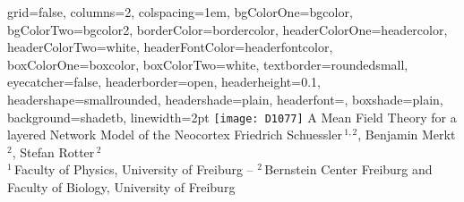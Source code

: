 \documentclass[portrait, final, a0paper, fontscale=0.34, leqno]{baposter}
\begin{document}
\newlength{\leftimgwidth}
\begin{poster}%
  {
  grid=false,
  columns=2,
  colspacing=1em,
  bgColorOne=bgcolor,
  bgColorTwo=bgcolor2,
  borderColor=bordercolor,
  headerColorOne=headercolor,
  headerColorTwo=white, %
  headerFontColor=headerfontcolor,
  boxColorOne=boxcolor,
  boxColorTwo=white,    %
  textborder=roundedsmall,
  eyecatcher=false,
  headerborder=open, 
  headerheight=0.1\textheight,
  headershape=smallrounded,
  headershade=plain,
  headerfont=\Large\textsf, %
  boxshade=plain,
  background=shadetb,
  linewidth=2pt
  }
  {\texttt{[image: D1077]}} %
  {\sf %
      A Mean Field Theory for a layered Network Model of the Neocortex
\vspace{0.3em}}
  {\sf %
      \vspace{0em}\Large{Friedrich Schuessler\,$^{1,2}$, Benjamin Merkt\,$^{2}$, Stefan Rotter\,$^{2}$\\
  \normalsize
  $^1$\,Faculty of Physics, University of Freiburg -- 
  $^2$\,Bernstein Center Freiburg and Faculty of Biology, University of Freiburg 
  }
  }
  {%
  }




\end{poster}
\end{document}
